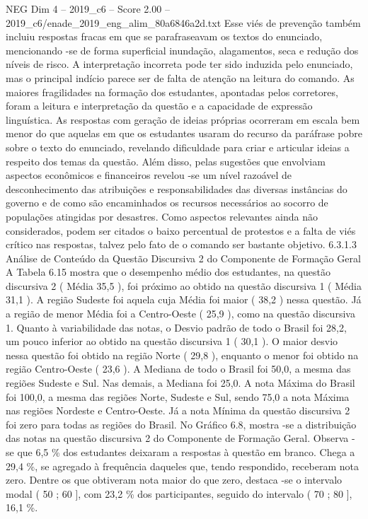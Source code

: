 \begin{textsample}{NEG Dim 4 – 2019\_c6 – Score 2.00 – 2019\_c6/enade\_2019\_eng\_alim\_80a6846a2d.txt}
Esse viés de prevenção também incluiu respostas fracas em que se parafraseavam os textos do enunciado, mencionando -se de forma superficial inundação, alagamentos, seca e redução dos níveis de risco.
A interpretação incorreta pode ter sido induzida pelo enunciado, mas o principal indício parece ser de falta de atenção na leitura do comando.
As maiores fragilidades na formação dos estudantes, apontadas pelos corretores, foram a leitura e interpretação da questão e a capacidade de expressão linguística.
As respostas com geração de ideias próprias ocorreram em escala bem menor do que aquelas em que os estudantes usaram do recurso da paráfrase pobre sobre o texto do enunciado, revelando dificuldade para criar e articular ideias a respeito dos temas da questão.
Além disso, pelas sugestões que envolviam aspectos econômicos e financeiros revelou -se um nível razoável de desconhecimento das atribuições e responsabilidades das diversas instâncias do governo e de como são encaminhados os recursos necessários ao socorro de populações atingidas por desastres.
Como aspectos relevantes ainda não considerados, podem ser citados o baixo percentual de protestos e a falta de viés crítico nas respostas, talvez pelo fato de o comando ser bastante objetivo. 6.3.1.3 Análise de Conteúdo da Questão Discursiva 2 do Componente de Formação Geral A Tabela 6.15 mostra que o desempenho médio dos estudantes, na questão discursiva 2 ( Média 35,5 ), foi próximo ao obtido na questão discursiva 1 ( Média 31,1 ).
A região Sudeste foi aquela cuja Média foi maior ( 38,2 ) nessa questão.
Já a região de menor Média foi a Centro-Oeste ( 25,9 ), como na questão discursiva 1.
Quanto à variabilidade das notas, o Desvio padrão de todo o Brasil foi 28,2, um pouco inferior ao obtido na questão discursiva 1 ( 30,1 ).
O maior desvio nessa questão foi obtido na região Norte ( 29,8 ), enquanto o menor foi obtido na região Centro-Oeste ( 23,6 ).
A Mediana de todo o Brasil foi 50,0, a mesma das regiões Sudeste e Sul.
Nas demais, a Mediana foi 25,0.
A nota Máxima do Brasil foi 100,0, a mesma das regiões Norte, Sudeste e Sul, sendo 75,0 a nota Máxima nas regiões Nordeste e Centro-Oeste.
Já a nota Mínima da questão discursiva 2 foi zero para todas as regiões do Brasil.
No Gráfico 6.8, mostra -se a distribuição das notas na questão discursiva 2 do Componente de Formação Geral.
Observa -se que 6,5 \% dos estudantes deixaram a respostas à questão em branco.
Chega a 29,4 \%, se agregado à frequência daqueles que, tendo respondido, receberam nota zero.
Dentre os que obtiveram nota maior do que zero, destaca -se o intervalo modal ( 50 ; 60 ], com 23,2 \% dos participantes, seguido do intervalo ( 70 ; 80 ], 16,1 \%.

\end{textsample}
